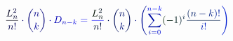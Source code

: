 \documentclass[12pt]{article}
\begin{document}
\makeatletter
\renewcommand*{\@textcolor}[3]{%
  \protect\leavevmode
  \begingroup
    \color#1{#2}#3%
  \endgroup
}
\makeatother
\begin{displaymath}
\mathcolor[RGB]{0,0,15}{\frac { \mathcolor[RGB]{0,0,30}{L} _ { \mathcolor[RGB]{0,0,45}{n} } ^ { \mathcolor[RGB]{0,0,60}{2} } } { \mathcolor[RGB]{0,0,75}{n} \mathcolor[RGB]{0,0,90}{!} } } \mathcolor[RGB]{0,0,105}{\cdot} \mathcolor[RGB]{0,0,120}{\binom { \mathcolor[RGB]{0,0,135}{n} } { \mathcolor[RGB]{0,0,150}{k} } } \mathcolor[RGB]{0,0,165}{\cdot} \mathcolor[RGB]{0,0,180}{D} _ { \mathcolor[RGB]{0,0,195}{n} \mathcolor[RGB]{0,0,210}{-} \mathcolor[RGB]{0,0,225}{k} } \mathcolor[RGB]{0,0,240}{=} \mathcolor[RGB]{0,0,255}{\frac { \mathcolor[RGB]{0,15,0}{L} _ { \mathcolor[RGB]{0,15,15}{n} } ^ { \mathcolor[RGB]{0,15,30}{2} } } { \mathcolor[RGB]{0,15,45}{n} \mathcolor[RGB]{0,15,60}{!} } } \mathcolor[RGB]{0,15,75}{\cdot} \mathcolor[RGB]{0,15,90}{\binom { \mathcolor[RGB]{0,15,105}{n} } { \mathcolor[RGB]{0,15,120}{k} } } \mathcolor[RGB]{0,15,135}{\cdot} \mathcolor[RGB]{0,15,150}{\left(} \mathcolor[RGB]{0,15,165}{\sum} _ { \mathcolor[RGB]{0,15,180}{i} \mathcolor[RGB]{0,15,195}{=} \mathcolor[RGB]{0,15,210}{0} } ^ { \mathcolor[RGB]{0,15,225}{n} \mathcolor[RGB]{0,15,240}{-} \mathcolor[RGB]{0,15,255}{k} } \mathcolor[RGB]{0,30,0}{(} \mathcolor[RGB]{0,30,15}{-} \mathcolor[RGB]{0,30,30}{1} \mathcolor[RGB]{0,30,45}{)} ^ { \mathcolor[RGB]{0,30,60}{i} } \mathcolor[RGB]{0,30,75}{\frac { \mathcolor[RGB]{0,30,90}{(} \mathcolor[RGB]{0,30,105}{n} \mathcolor[RGB]{0,30,120}{-} \mathcolor[RGB]{0,30,135}{k} \mathcolor[RGB]{0,30,150}{)} \mathcolor[RGB]{0,30,165}{!} } { \mathcolor[RGB]{0,30,180}{i} \mathcolor[RGB]{0,30,195}{!} } } \mathcolor[RGB]{0,30,210}{\right)}
\end{displaymath}
\end{document}
